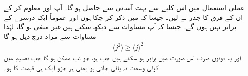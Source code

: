 عملی استعمال میں   اس کلیے سے بہت آسانی سے حاصل ہو گا۔ آپ  اور  معلوم کر کے  ان کے فرق کا جذر لے لیں۔ جیسا کہ   میں  ذکر کر چکا ہوں   اور  عموماً ایک دوسرے کے برابر نہیں ہوں گے۔ جیسا  کہ آپ مساوات  سے دیکھ سکتے ہیں     غیر منفی ہو گا،  لہٰذا  مساوات  سے مراد   درج ذیل ہو گا
\begin{align}
 \langle j^2 \rangle \geq \langle j \rangle ^{2}
\end{align}
اور یہ دونوں صرف اس صورت میں  برابر ہو سکتے ہیں جب  ہو،   جو تب ممکن ہو گا جب تقسیم میں کوئی  وسعت  نہ پائی جاتی  ہو یعنی ہر جزو ایک ہی قیمت کا ہو۔ 


